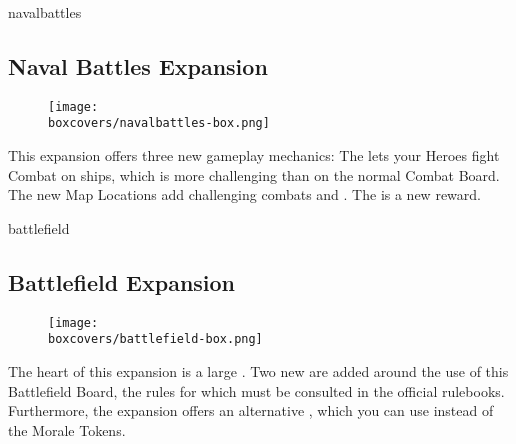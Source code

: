 \begin{multicols*}{2}
\begin{expansion}[title=]{navalbattles}
    \subsection*{\color{navalbattles}Naval Battles Expansion}
    \setlength\intextsep{0pt}
    \setlength\columnsep{0.8em}
    \begin{wrapfigure}{l}{0.35\textwidth}
        \texttt{[image: \\boxcovers/navalbattles-box.png]}
    \end{wrapfigure}
    This expansion offers three new gameplay mechanics:
    The  lets your Heroes fight Combat on ships, which is more challenging than on the normal Combat Board.
    The new  Map Locations add challenging combats and .
    The  is a new reward.
\end{expansion}

\columnbreak
\begin{expansion}[title=]{battlefield}
    \subsection*{\color{battlefield}Battlefield Expansion}
    \setlength\intextsep{0pt}
    \setlength\columnsep{0.8em}
    \begin{wrapfigure}{l}{0.35\textwidth}
        \texttt{[image: \\boxcovers/battlefield-box.png]}
    \end{wrapfigure}
    The heart of this expansion is a large . Two new  are added around the use of this Battlefield Board, the rules for which must be consulted in the official rulebooks. Furthermore, the expansion offers an alternative , which you can use instead of the Morale Tokens.
\end{expansion}
\end{multicols*}

